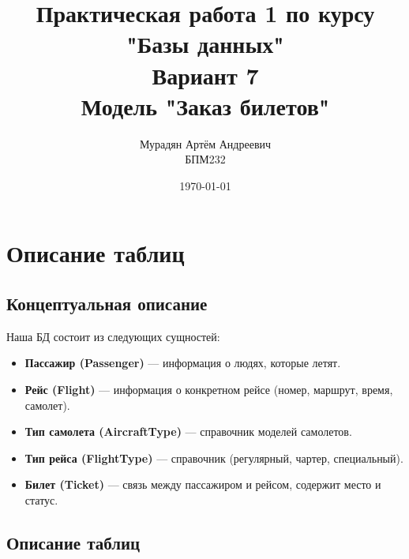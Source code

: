 \documentclass[a4paper,12pt]{article}
\title{Практическая работа 1 по курсу\\"Базы данных"\\Вариант 7\\Модель "Заказ билетов"}
\author{Мурадян Артём Андреевич\\БПМ232}
\date{\today}
\begin{document}
\maketitle
\newpage

\tableofcontents
\newpage

\section{Описание таблиц}

\subsection{Концептуальная описание}
Наша БД состоит из следующих сущностей:
\begin{itemize}
    \item \textbf{Пассажир (Passenger)} — информация о людях, которые летят.
    \item \textbf{Рейс (Flight)} — информация о конкретном рейсе (номер, маршрут, время, самолет).
    \item \textbf{Тип самолета (AircraftType)} — справочник моделей самолетов.
    \item \textbf{Тип рейса (FlightType)} — справочник (регулярный, чартер, специальный).
    \item \textbf{Билет (Ticket)} — связь между пассажиром и рейсом, содержит место и статус.
\end{itemize}

\subsection{Описание таблиц}
\end{document}
